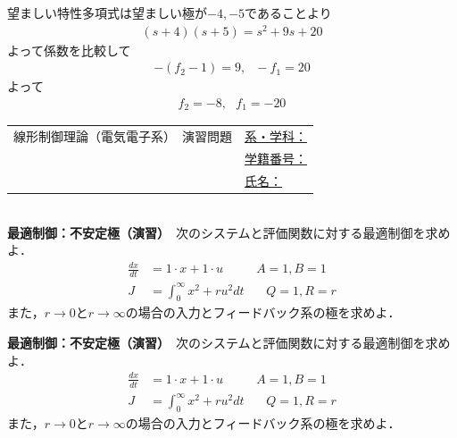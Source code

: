 \documentclass[a4paper,11pt]{jreport}
\begin{document}
望ましい特性多項式は望ましい極が$-4,-5$であることより
\begin{align*}
	(s+4)(s+5) = s^2 + 9s + 20
\end{align*}
よって係数を比較して
\begin{align*}
	-(f_2-1)=9, \ \ \ -f_1=20
\end{align*}
よって
\begin{align*}
	f_2=-8, \ \ \ f_1=-20
\end{align*}

\newpage
\begin{tabular}{cl}
\hspace*{2cm}
{\large 線形制御理論（電気電子系）　演習問題}
\hspace{1cm}
&
\underline{系・学科：\hspace{3cm}}
\\[2mm]
&\underline{学籍番号：\hspace{3cm}}
\\[2mm]
&\underline{氏名：\hspace{5cm}}
\end{tabular}
\ \\

\noindent
{\bf 最適制御：不安定極（演習）}　次のシステムと評価関数に対する最適制御を求めよ．
\begin{align*}
	\frac{dx}{dt} & = 1 \cdot x + 1 \cdot u \ \ \ \ \ \ \ \ \ \ \ \ A=1,B=1\\
	J & = \int_0^{\infty} x^2 + r u^2 dt \ \ \ \ \ \ \ \ Q=1,R=r
\end{align*}
また，$r\rightarrow 0$と$r\rightarrow \infty$の場合の入力とフィードバック系の極を求めよ．


\newpage

\noindent
{\bf 最適制御：不安定極（演習）}　次のシステムと評価関数に対する最適制御を求めよ．
\begin{align*}
	\frac{dx}{dt} & = 1 \cdot x + 1 \cdot u \ \ \ \ \ \ \ \ \ \ \ \ A=1,B=1\\
	J & = \int_0^{\infty} x^2 + r u^2 dt \ \ \ \ \ \ \ \ Q=1,R=r
\end{align*}
また，$r\rightarrow 0$と$r\rightarrow \infty$の場合の入力とフィードバック系の極を求めよ．
\\
\end{document}
